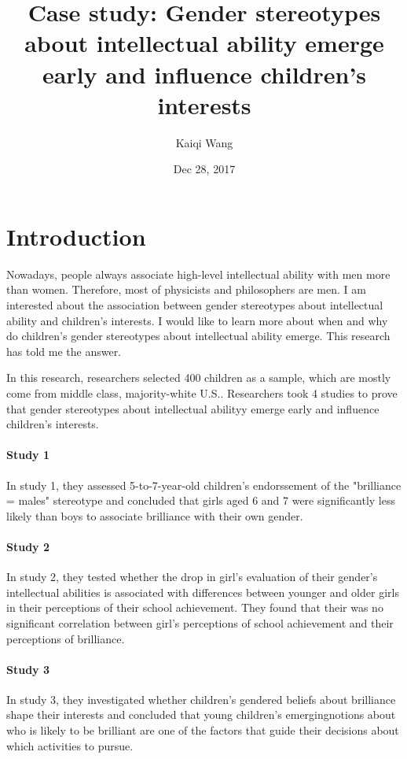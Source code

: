 \documentclass{article}
\begin{document}
\title{Case study: Gender stereotypes about intellectual ability emerge early and influence children's interests}
\author {Kaiqi Wang}
\date{Dec 28, 2017}
\maketitle



\section{Introduction}

Nowadays, people always associate high-level intellectual ability with men more than women. Therefore, most of physicists and philosophers are men. I am interested about the association between gender stereotypes about intellectual ability and children's interests. I would like to learn more about when and why do children's gender stereotypes about intellectual ability emerge. This research has told me the answer. 

In this research, researchers selected 400 children as a sample, which are mostly come from middle class, majority-white U.S.. Researchers took 4 studies to prove that gender stereotypes about intellectual abilityy emerge early and influence children's interests. 

\paragraph{Study 1} In study 1, they assessed 5-to-7-year-old children's endorssement of the "brilliance = males" stereotype and concluded that girls aged 6 and 7 were significantly less likely than boys to associate brilliance with their own gender.

\paragraph{Study 2} In study 2, they tested whether the drop in girl's evaluation of their gender's intellectual abilities is associated with differences between younger and older girls in their perceptions of their school achievement. They found that their was no significant correlation between girl's perceptions of school achievement and their perceptions of brilliance. 

\paragraph{Study 3} In study 3, they investigated whether children's gendered beliefs about brilliance shape their interests and concluded that young children's emergingnotions about who is likely to be brilliant are one of the factors that guide their decisions about which activities to pursue. 
\end{document}
